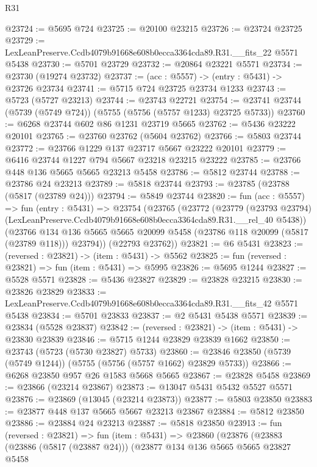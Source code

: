 \begin{lexlean}{R31}
\begin{coremodule}
@23724 := @5695 @724
@23725 := @20100 @23215
@23726 := @23724 @23725
@23729 := LexLeanPreserve.Ccdb4079b91668e608b0ecca3364cda89.R31.__fits_22 @5571 @5438
@23730 := @5701 @23729
@23732 := @20864 @23221 @5571
@23734 := @23730 (@19274 @23732)
@23737 := (acc : @5557) -> (entry : @5431) -> @23726 @23734
@23741 := @5715 @724 @23725 @23734 @1233
@23743 := @5723 (@5727 @23213)
@23744 := @23743 @22721
@23754 := @23741 @23744 (@5739 (@5749 @724)) (@5755 (@5756 (@5757 @1233) @23725 @5733))
@23760 := @6268 @23744 @602 @86 @1231 @23719 @5665
@23762 := @5436 @23222 @20101
@23765 := @23760 @23762 (@5604 @23762)
@23766 := @5803 @23744
@23772 := @23766 @1229 @137 @23717 @5667 @23222 @20101
@23779 := @6416 @23744 @1227 @794 @5667 @23218 @23215 @23222
@23785 := @23766 @448 @136 @5665 @5665 @23213 @5458
@23786 := @5812 @23744
@23788 := @23786 @24 @23213
@23789 := @5818 @23744
@23793 := @23785 (@23788 (@5817 (@23789 @24)))
@23794 := @5849 @23744
@23820 := fun (acc : @5557) =>
  fun (entry : @5431) =>
  @23754
    (@23765
      (@23772
        (@23779
          (@23793 @23794)
          (LexLeanPreserve.Ccdb4079b91668e608b0ecca3364cda89.R31.__rel_40 @5438))
        (@23766
          @134
          @136
          @5665
          @5665
          @20099
          @5458
          (@23786 @118 @20099 (@5817 (@23789 @118)))
          @23794))
      (@22793 @23762))
@23821 := @6 @5431
@23823 := (reversed : @23821) -> (item : @5431) -> @5562
@23825 := fun (reversed : @23821) => fun (item : @5431) => @5995
@23826 := @5695 @1244
@23827 := @5528 @5571
@23828 := @5436 @23827
@23829 := @23828 @23215
@23830 := @23826 @23829
@23833 := LexLeanPreserve.Ccdb4079b91668e608b0ecca3364cda89.R31.__fits_42 @5571 @5438
@23834 := @5701 @23833
@23837 := @2 @5431 @5438 @5571
@23839 := @23834 (@5528 @23837)
@23842 := (reversed : @23821) -> (item : @5431) -> @23830 @23839
@23846 := @5715 @1244 @23829 @23839 @1662
@23850 := @23743 (@5723 (@5730 @23827) @5733)
@23860 := @23846 @23850 (@5739 (@5749 @1244)) (@5755 (@5756 (@5757 @1662) @23829 @5733))
@23866 := @6268 @23850 @957 @26 @1583 @5668 @5665
@23867 := @23828 @5458
@23869 := @23866 (@23214 @23867)
@23873 := @13047 @5431 @5432 @5527 @5571
@23876 := @23869 (@13045 (@23214 @23873))
@23877 := @5803 @23850
@23883 := @23877 @448 @137 @5665 @5667 @23213 @23867
@23884 := @5812 @23850
@23886 := @23884 @24 @23213
@23887 := @5818 @23850
@23913 := fun (reversed : @23821) =>
  fun (item : @5431) =>
  @23860
    (@23876
      (@23883
        (@23886 (@5817 (@23887 @24)))
        (@23877
          @134
          @136
          @5665
          @5665
          @23827
          @5458

\end{coremodule}
\end{lexlean}
